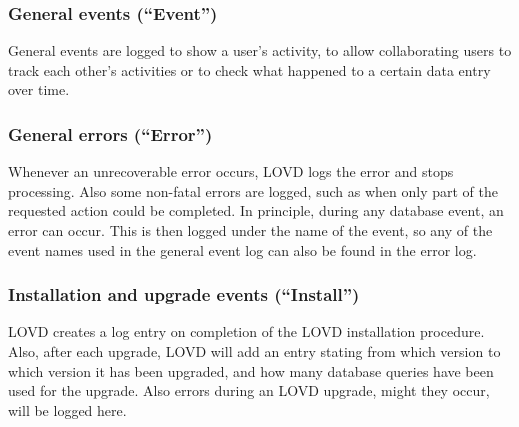 \documentclass[a4paper,oneside,openany,12pt]{memoir}
\begin{document}

\subsubsection{General events (``Event'')}
General events are logged to show a user's activity, to allow collaborating users to track each other's activities or to check what happened to a certain data entry over time.


\subsubsection{General errors (``Error'')}
Whenever an unrecoverable error occurs, LOVD logs the error and stops processing.
Also some non-fatal errors are logged, such as when only part of the requested action could be completed.
In principle, during any database event, an error can occur.
This is then logged under the name of the event, so any of the event names used in the general event log can also be found in the error log.

\subsubsection{Installation and upgrade events (``Install'')}
LOVD creates a log entry on completion of the LOVD installation procedure.
Also, after each upgrade, LOVD will add an entry stating from which version to which version it has been upgraded, and how many database queries have been used for the upgrade.
Also errors during an LOVD upgrade, might they occur, will be logged here.
\end{document}
